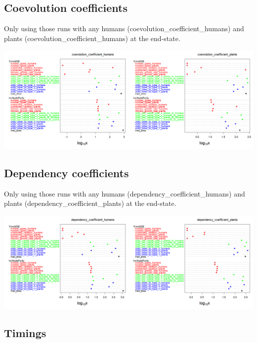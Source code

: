 \documentclass[
]{book}
\begin{document}
\newpage

\hypertarget{coevolution-coefficients}{%
\subsection{Coevolution coefficients}\label{coevolution-coefficients}}

Only using those runs with any humans (coevolution\_coefficient\_humans) and plants (coevolution\_coefficient\_humans) at the end-state.

\includegraphics[width=1\linewidth]{plots/5_LHS_coevo_variableImportancePlot}

\newpage

\hypertarget{dependency-coefficients}{%
\subsection{Dependency coefficients}\label{dependency-coefficients}}

Only using those runs with any humans (dependency\_coefficient\_humans) and plants (dependency\_coefficient\_plants) at the end-state.

\includegraphics[width=1\linewidth]{plots/5_LHS_dependency_coefficient_variableImportancePlot}

\hypertarget{timings}{%
\subsection{Timings}\label{timings}}
\end{document}
